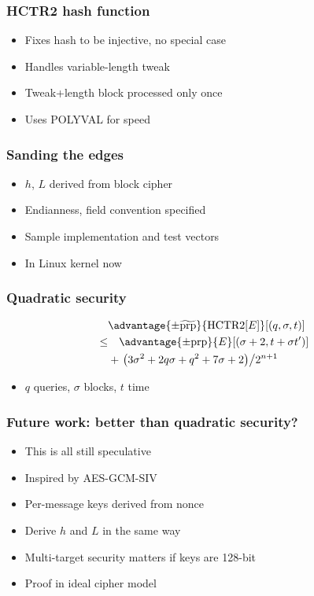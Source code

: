 \documentclass{beamer}
\begin{document}
\begin{frame}

\frametitle{HCTR2 hash function}

\begin{itemize}
    \item Fixes hash to be injective, no special case
    \item Handles variable-length tweak
    \item Tweak+length block processed only once
    \item Uses POLYVAL for speed
\end{itemize}
\end{frame}

\begin{frame}

\frametitle{Sanding the edges}

\begin{itemize}
    \item $h$, $L$ derived from block cipher
    \item Endianness, field convention specified
    \item Sample implementation and test vectors
    \item In Linux kernel now
\end{itemize}
\end{frame}

\begin{frame}

    \frametitle{Quadratic security}

    \begin{align*}
        &\advantage{\pm \widetilde{\mathrm{prp}}}{\HCTR[E]}[(q, \sigma, t)] \\
        \leq & \quad \advantage{\pm \mathrm{prp}}{E}[(\sigma + 2, t + \sigma t')] \\
        &+ \left.\left(3\sigma^2 + 2q\sigma + q^2 + 7\sigma + 2\right)\middle/2^{n+1}\right.
    \end{align*}
        

    \begin{itemize}
        \item \(q\) queries, \(\sigma\) blocks, \(t\) time
    \end{itemize}
\end{frame}
    
\begin{frame}
\frametitle{Future work: better than quadratic security?}

\begin{itemize}
    \item This is all still speculative
    \item Inspired by AES-GCM-SIV
    \item Per-message keys derived from nonce
    \item Derive $h$ and $L$ in the same way
    \item Multi-target security matters if keys are 128-bit
    \item Proof in ideal cipher model
\end{itemize}
\end{frame}
\end{document}
